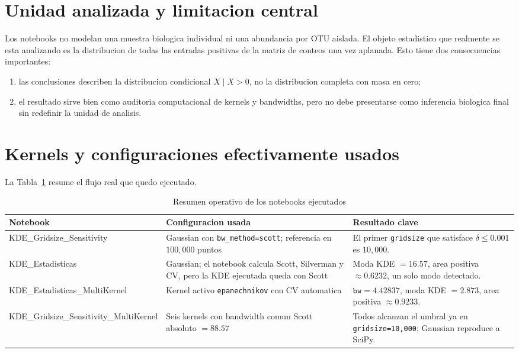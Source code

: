 \documentclass[11pt,a4paper]{article}
\begin{document}
\section{Unidad analizada y limitacion central}
Los notebooks no modelan una muestra biologica individual ni una abundancia por OTU aislada. El
objeto estadistico que realmente se esta analizando es la distribucion de todas las entradas
positivas de la matriz de conteos una vez aplanada. Esto tiene dos consecuencias importantes:
\begin{enumerate}[leftmargin=1.5em]
\item las conclusiones describen la distribucion condicional \(X \mid X > 0\), no la distribucion
      completa con masa en cero;
\item el resultado sirve bien como auditoria computacional de kernels y bandwidths, pero no debe
      presentarse como inferencia biologica final sin redefinir la unidad de analisis.
\end{enumerate}

\section{Kernels y configuraciones efectivamente usados}
La Tabla~\ref{tab:flujo-notebooks} resume el flujo real que quedo ejecutado.

\begin{table}[H]
\centering
\caption{Resumen operativo de los notebooks ejecutados}
\label{tab:flujo-notebooks}
\begin{tabularx}{\textwidth}{>{\ttfamily}l>{\raggedright\arraybackslash}X>{\raggedright\arraybackslash}X}
\toprule
Notebook & Configuracion usada & Resultado clave \\
\midrule
KDE\_Gridsize\_Sensitivity &
Gaussian con \texttt{bw\_method=scott}; referencia en \(100{,}000\) puntos &
El primer \texttt{gridsize} que satisface \(\delta \le 0.001\) es \(10{,}000\). \\

KDE\_Estadisticas &
Gaussian; el notebook calcula Scott, Silverman y CV, pero la KDE ejecutada queda con Scott &
Moda KDE \(=16.57\), area positiva \(\approx 0.6232\), un solo modo detectado. \\

KDE\_Estadisticas\_MultiKernel &
Kernel activo \texttt{epanechnikov} con CV automatica &
\(\texttt{bw}=4.42837\), moda KDE \(=2.873\), area positiva \(\approx 0.9233\). \\

KDE\_Gridsize\_Sensitivity\_MultiKernel &
Seis kernels con bandwidth comun Scott absoluto \(=88.57\) &
Todos alcanzan el umbral ya en \texttt{gridsize=10,000}; Gaussian reproduce a SciPy. \\
\bottomrule
\end{tabularx}
\end{table}
\end{document}

